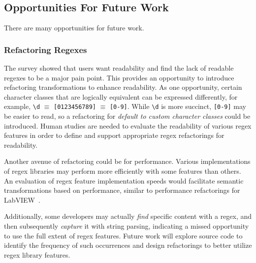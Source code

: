 \subsection{Opportunities For Future Work}

There are many opportunities for future work. %




\subsubsection{Refactoring Regexes}
The survey showed that users want readability and find the lack of readable regexes to be a major pain point.
This provides an opportunity to introduce refactoring transformations to enhance readability.
As one opportunity, certain character classes that are logically equivalent can be expressed differently, for example, \verb!\d! $\equiv$ \verb![0123456789]! $\equiv$ \verb![0-9]!. While \verb!\d! is more succinct, \verb![0-9]! may be easier to read, so a refactoring for \emph{default to custom character classes} could be introduced.
Human studies are needed to evaluate the readability of various regex features in order to define and support appropriate regex refactorings for readability.

Another avenue of refactoring could be for performance. Various implementations of regex libraries may perform more efficiently with some features than others. An evaluation of regex feature implementation speeds would facilitate semantic transformations based on performance, similar to performance refactorings for LabVIEW~\cite{chambers2013smell, chambers2015impact}.


Additionally, some developers may actually \emph{find} specific content with a regex, and then subsequently \emph{capture} it with string parsing, indicating a missed opportunity to use the full extent of regex features. Future work will explore source code to identify the frequency of such occurrences and design refactorings to better utilize regex library features.


